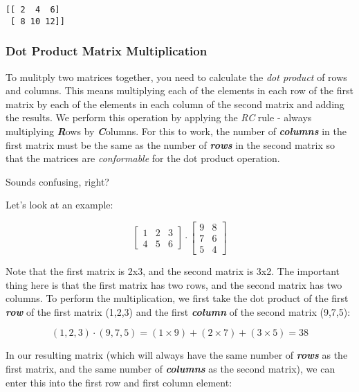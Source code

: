 \documentclass[11pt]{article}
\begin{document}
    \begin{Verbatim}[commandchars=\\\{\}]
[[ 2  4  6]
 [ 8 10 12]]

    \end{Verbatim}

    \hypertarget{dot-product-matrix-multiplication}{%
\subsubsection{Dot Product Matrix
Multiplication}\label{dot-product-matrix-multiplication}}

To mulitply two matrices together, you need to calculate the \emph{dot
product} of rows and columns. This means multiplying each of the
elements in each row of the first matrix by each of the elements in each
column of the second matrix and adding the results. We perform this
operation by applying the \emph{RC} rule - always multiplying
\textbf{\emph{R}}ows by \textbf{\emph{C}}olumns. For this to work, the
number of \textbf{\emph{columns}} in the first matrix must be the same
as the number of \textbf{\emph{rows}} in the second matrix so that the
matrices are \emph{conformable} for the dot product operation.

Sounds confusing, right?

Let's look at an example:

\begin{equation}\begin{bmatrix}1 & 2 & 3 \\4 & 5 & 6\end{bmatrix} \cdot \begin{bmatrix}9 & 8 \\ 7 & 6 \\ 5 & 4\end{bmatrix}\end{equation}

Note that the first matrix is 2x3, and the second matrix is 3x2. The
important thing here is that the first matrix has two rows, and the
second matrix has two columns. To perform the multiplication, we first
take the dot product of the first \textbf{\emph{row}} of the first
matrix (1,2,3) and the first \textbf{\emph{column}} of the second matrix
(9,7,5):

\begin{equation}(1,2,3) \cdot (9,7,5) = (1 \times 9) + (2 \times 7) + (3 \times 5) = 38\end{equation}

In our resulting matrix (which will always have the same number of
\textbf{\emph{rows}} as the first matrix, and the same number of
\textbf{\emph{columns}} as the second matrix), we can enter this into
the first row and first column element:
\end{document}
